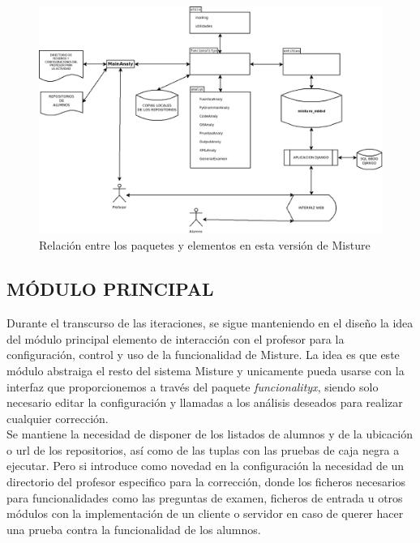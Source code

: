 \begin{figure}[H]
   \centering
   \includegraphics[width=16cm]{img/Diagram3_iteracion2}
   \caption{Relación entre los paquetes y elementos en esta versión de Misture}
   \label{figura:regex}
\end{figure}



\subsection{MÓDULO PRINCIPAL} 
\label{subsec:mod_principal}

Durante el transcurso de las iteraciones, se sigue manteniendo en el diseño la idea del módulo principal elemento de interacción con el profesor para la configuración, control y uso de la funcionalidad de Misture. La idea es que este módulo abstraiga el resto del sistema Misture y unicamente pueda usarse con la interfaz que proporcionemos a través del paquete \textit{funcionalityx}, siendo solo necesario editar la configuración y llamadas a los análisis deseados para realizar cualquier corrección.\\


Se mantiene la necesidad de disponer de los listados de alumnos y de la ubicación o url de los repositorios, así como de las tuplas con las pruebas de caja negra a ejecutar. Pero si introduce como novedad en la configuración la necesidad de un directorio del profesor especifico para la corrección, donde los ficheros necesarios para funcionalidades como las preguntas de examen, ficheros de entrada u otros módulos con la implementación de un cliente o servidor en caso de querer hacer una prueba contra la funcionalidad de los alumnos.

